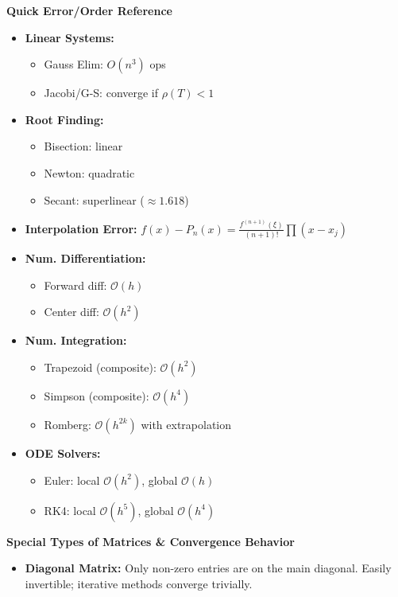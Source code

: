 \documentclass[9pt,letterpaper]{article}
\begin{document}
\begin{multicols*}{3}
  \noindent
  \textbf{\large Quick Error/Order Reference}
  \begin{itemize}
    \item \textbf{Linear Systems:} 
      \begin{itemize}
        \item Gauss Elim: $O(n^3)$ ops
        \item Jacobi/G-S: converge if $\rho(T)<1$
      \end{itemize}
    \item \textbf{Root Finding:} 
      \begin{itemize}
        \item Bisection: linear
        \item Newton: quadratic
        \item Secant: superlinear ($\approx1.618$)
      \end{itemize}
    \item \textbf{Interpolation Error:} $\displaystyle f(x)-P_n(x)=\frac{f^{(n+1)}(\xi)}{(n+1)!}\prod (x-x_j)$
    \item \textbf{Num. Differentiation:} 
      \begin{itemize}
        \item Forward diff: $\mathcal{O}(h)$
        \item Center diff: $\mathcal{O}(h^2)$
      \end{itemize}
    \item \textbf{Num. Integration:} 
      \begin{itemize}
        \item Trapezoid (composite): $\mathcal{O}(h^2)$
        \item Simpson (composite): $\mathcal{O}(h^4)$
        \item Romberg: $\mathcal{O}(h^{2k})$ with extrapolation
      \end{itemize}
    \item \textbf{ODE Solvers:} 
      \begin{itemize}
        \item Euler: local $\mathcal{O}(h^2)$, global $\mathcal{O}(h)$
        \item RK4: local $\mathcal{O}(h^5)$, global $\mathcal{O}(h^4)$
      \end{itemize}
  \end{itemize}

  \noindent
  \textbf{\large Special Types of Matrices \& Convergence Behavior}
  \begin{itemize}
    \item \textbf{Diagonal Matrix:} Only non-zero entries are on the main diagonal. Easily invertible; iterative methods converge trivially.


\end{itemize}
\end{multicols*}
\end{document}
